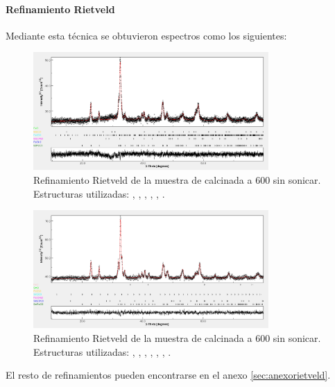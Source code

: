 \documentclass[../main.tex]{subfiles}
\begin{document}
\paragraph{Refinamiento Rietveld}
Mediante esta técnica se obtuvieron espectros como los siguientes:
\begin{figure}[H]
    \centering
    \includegraphics[width=0.8\textwidth]{fig/DRX600NdFeO3.png}
    \caption{Refinamiento Rietveld de la muestra de \neod{} calcinada a 600\gradoC{} sin sonicar. Estructuras utilizadas: \neod{} \cite{ndfeo3},  \cite{ndoh3},  \cite{feoh2},  \cite{nd2o3},  \cite{fe2o3},  \cite{feo}.}
    \label{fig:rietveld600ndresultados}
\end{figure}
\begin{figure}[H]
    \centering
    \includegraphics[width=0.8\textwidth]{fig/DRX700SmFeO3.png}
    \caption{Refinamiento Rietveld de la muestra de \neod{} calcinada a 600\gradoC{} sin sonicar. Estructuras utilizadas: \sama{} \cite{smfeo3},  \cite{smoh3},  \cite{feoh2},  \cite{sm2o3},  \cite{fe2o3},  \cite{smo},  \cite{feo}.}
    \label{fig:rietveld700smresultados}
\end{figure}
El resto de refinamientos pueden encontrarse en el anexo \ref{sec:anexorietveld}.
\end{document}
